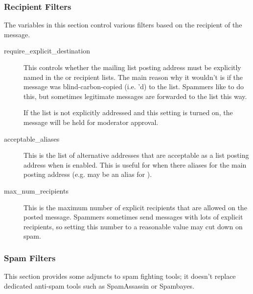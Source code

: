 \documentclass{howto}
\begin{document}
\subsubsection{Recipient Filters}

The variables in this section control various filters based on the
recipient of the message.

\begin{description}
\item[require_explicit_destination]
    This controls whether the mailing list posting address must be
    explicitly named in the  or 
    recipient lists.  The main reason why it wouldn't is if the
    message was blind-carbon-copied (i.e. 'd) to the
    list.  Spammers like to do this, but sometimes legitimate messages
    are forwarded to the list this way.

    If the list is not explicitly addressed and this setting is turned
    on, the message will be held for moderator approval.

\item[acceptable_aliases]
    This is the list of alternative addresses that are acceptable as a
    list posting address when  is
    enabled.  This is useful for when there aliases for the main
    posting address (e.g.  may be an alias for
    ).

\item[max_num_recipients]
    This is the maximum number of explicit recipients that are allowed
    on the posted message.  Spammers sometimes send messages with lots
    of explicit recipients, so setting this number to a reasonable
    value may cut down on spam.
\end{description}

\subsubsection{Spam Filters}

This section provides some adjuncts to spam fighting tools; it
doesn't replace dedicated anti-spam tools such as SpamAssassin or
Spambayes.
\end{document}
